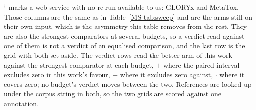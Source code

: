 \begin{table}[t]
\begin{threeparttable}
\begin{tablenotes}[flushleft]
\item $^{\dagger}$ marks a web service with no re-run available to us: GLORYx and MetaTox. Those columns are the same as in Table~\ref{MS-tab:sweep} and are the arms still on their own input, which is the asymmetry this table removes from the rest. They are also the strongest comparators at several budgets, so a verdict read against one of them is not a verdict of an equalised comparison, and the last row is the grid with both set aside. The verdict rows read the better arm of this work against the strongest comparator at each budget, $+$ where the paired interval excludes zero in this work's favour, $-$ where it excludes zero against, $\cdot$ where it covers zero; no budget's verdict moves between the two. References are looked up under the corpus string in both, so the two grids are scored against one annotation.
\end{tablenotes}
\end{threeparttable}
\end{table}
